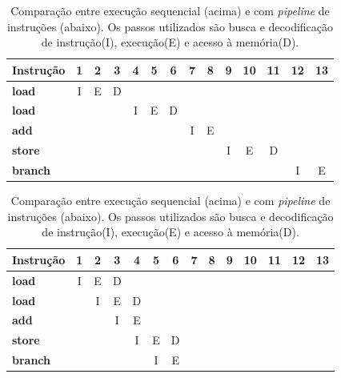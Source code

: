 \documentclass[
	12pt,				%
	openright,			%
	oneside,			%
	a4paper,			%
	english,			%
	french,				%
	spanish,			%
	brazil,				%
	]{abntex2}
\begin{document}
\begin{table}[h]
  \centering

  \begin{tabular}{l *{13}{c}}
    \toprule
    \textbf{Instrução}
      & \textbf{1}   & \textbf{2}   & \textbf{3}   & \textbf{4}
      & \textbf{5}   & \textbf{6}   & \textbf{7}   & \textbf{8}
      & \textbf{9}   & \textbf{10}  & \textbf{11}  & \textbf{12}
      & \textbf{13} \\
    \midrule
    \textbf{load}   & I & E & D &   &   &   &   &   &   &   &   &   &   \\
    \textbf{load}   &   &   &   & I & E & D &   &   &   &   &   &   &   \\
    \textbf{add}    &   &   &   &   &   &   & I & E &   &   &   &   &   \\
    \textbf{store}  &   &   &   &   &   &   &   &   & I & E & D &   &   \\
    \textbf{branch} &   &   &   &   &   &   &   &   &   &   &   & I & E \\
    \bottomrule
  \end{tabular}

  \vspace{1em}

  \begin{tabular}{l *{13}{c}}
    \toprule
    \textbf{Instrução}
      & \textbf{1}   & \textbf{2}   & \textbf{3}   & \textbf{4}
      & \textbf{5}   & \textbf{6}   & \textbf{7}   & \textbf{8}
      & \textbf{9}   & \textbf{10}  & \textbf{11}  & \textbf{12}
      & \textbf{13} \\
    \midrule
    \textbf{load}   & I & E & D &   &   &   &   &   &   &   &   &   &   \\
    \textbf{load}   &   & I & E & D &   &   &   &   &   &   &   &   &   \\
    \textbf{add}    &   &   & I & E &   &   &   &   &   &   &   &   &   \\
    \textbf{store}  &   &   &   & I & E & D &   &   &   &   &   &   &   \\
    \textbf{branch} &   &   &   &   & I & E &   &   &   &   &   &   &   \\
    \bottomrule
  \end{tabular}
  \caption{Comparação entre execução sequencial (acima) e com \textit{pipeline} de instruções (abaixo). Os passos utilizados são busca e decodificação de instrução(I), execução(E) e acesso à memória(D). \cite[p.49-50]{stallings_reduced_1988}} \label{tab:pipeline_comparison}
\end{table}
\end{document}
